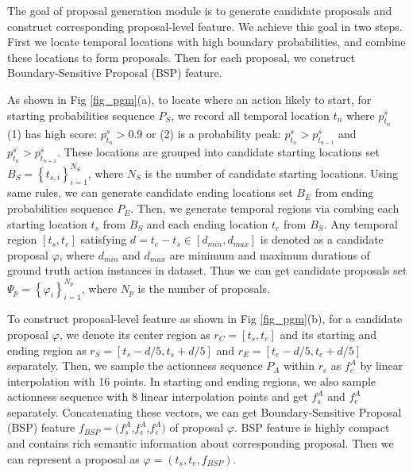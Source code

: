 \documentclass[runningheads]{llncs}
\begin{document}
The goal of proposal generation module is to generate candidate proposals and construct corresponding proposal-level feature.
We achieve this goal in two steps. First we locate temporal locations with high boundary probabilities, and combine these locations to form proposals. Then for each proposal, we construct Boundary-Sensitive Proposal (BSP) feature.

As shown in Fig \ref{fig_pgm}(a), to locate where an action likely to start, for starting probabilities sequence $P_S$, we record all temporal location $t_n$ where  $p^s_{t_n}$ (1) has high score: $p^s_{t_n}> 0.9$ or  (2) is a probability peak: $p^s_{t_n}> p^s_{t_{n-1}}$ and $p^s_{t_n}> p^s_{t_{n+1}}$.
These locations are  grouped into candidate starting locations set $B_S=\left \{ t_{s,i} \right \}_{i=1}^{N_S}$, where $N_S$ is the number of candidate starting locations.
Using same rules, we can generate candidate ending locations set $B_E$ from ending probabilities sequence $P_E$.
Then, we generate temporal regions via combing each starting location $t_{s}$ from $B_S$ and each ending location $t_{e}$ from $B_S$.
Any temporal region $\left [ t_s, t_e \right ]$ satisfying $ d=t_e- t_s \in [d_{min}, d_{max}]$ is denoted as a candidate proposal $\varphi$, where $d _{min}$ and $d_{max}$ are minimum and maximum durations of ground truth action instances in dataset. Thus we can get candidate proposals set $\Psi_p=\left \{ \varphi_i \right \}_{i=1}^{N_p}$, where $N_p$ is the number of proposals.

To construct proposal-level feature as shown in Fig \ref{fig_pgm}(b), for a candidate proposal $\varphi$, we denote its  center region as $r_C=[t_s,t_e]$ and its starting and ending region as $r_S=[ t_s-d/5,t_s+d/5 ]$ and $r_E= [ t_e-d/5,t_e+d/5 ]$ separately. %
Then, we sample the actionness sequence $P_A$ within $r_c$ as $f_{c}^A$  by linear interpolation with 16 points. In starting and ending regions, we also sample actionness  sequence with 8 linear  interpolation points and get $f_{s}^A$ and $f_{e}^A$ separately. Concatenating these vectors, we can get Boundary-Sensitive Proposal (BSP) feature $f_{BSP}=(f_s^A$,$f_c^A$,$f_e^A)$ of proposal $\varphi$.
BSP feature is highly compact and contains rich semantic information about corresponding proposal.
Then we can represent a proposal as $\varphi=(t_s,t_e,f_{BSP})$.%
\end{document}
